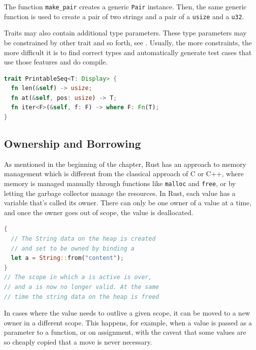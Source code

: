 \documentclass[paper=a4,%
  twoside,%
  BCOR4mm,%
  abstract=true,%
  toc=bibliography,%
  chapterprefix=true,%
  toc=bibliographynumbered,%
  open=right,%
  english,%
  pagesize=pdftex]{scrreprt}
\begin{document}
The function \lstinline{make_pair} creates a generic \lstinline{Pair} instance. Then, the same generic function is used to create a pair of two strings and a pair of a \lstinline{usize} and a \lstinline{u32}.

Traits may also contain additional type parameters. These type parameters may be constrained by other trait and so forth, see . Usually, the more constraints, the more difficult it is to find correct types and automatically generate test cases that use those features and do compile.

\begin{lstlisting}[language=Rust, style=boxed, caption={Type parameters can be specified for a trait to make it generic. These appear after the trait name, using the same syntax used in generic functions}, label=lst:traits-with-type-bounds]
trait PrintableSeq<T: Display> {
  fn len(&self) -> usize;
  fn at(&self, pos: usize) -> T;
  fn iter<F>(&self, f: F) -> where F: Fn(T);
}
\end{lstlisting}

\subsection{Ownership and Borrowing}
As mentioned in the beginning of the chapter, Rust has an approach to memory management which is different from the classical approach of C or C++, where memory is managed manually through functions like \lstinline{malloc} and \lstinline{free}, or by letting the garbage collector manage the resources. In Rust, each value has a variable that's called its owner. There can only be one owner of a value at a time, and once the owner goes out of scope, the value is deallocated.

\begin{lstlisting}[language=Rust, style=boxed, caption=Heap data owned by binding, label=lst:example-ownership]
{
  // The String data on the heap is created
  // and set to be owned by binding a
  let a = String::from("content");
}
// The scope in which a is active is over,
// and a is now no longer valid. At the same
// time the string data on the heap is freed
\end{lstlisting}

In cases where the value needs to outlive a given scope, it can be moved to a new owner in a different scope. This happens, for example, when a value is passed as a parameter to a function, or on assignment, with the caveat that some values are so cheaply copied that a move is never necessary.
\end{document}
